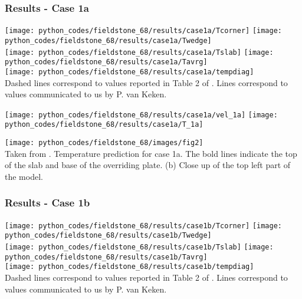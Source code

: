 \newpage
\subsubsection*{Results - Case 1a} 

\begin{center}
\texttt{[image: python\_codes/fieldstone\_68/results/case1a/Tcorner]}
\texttt{[image: python\_codes/fieldstone\_68/results/case1a/Twedge]}\\
\texttt{[image: python\_codes/fieldstone\_68/results/case1a/Tslab]}
\texttt{[image: python\_codes/fieldstone\_68/results/case1a/Tavrg]}\\
\texttt{[image: python\_codes/fieldstone\_68/results/case1a/tempdiag]}\\
{\captionfont Dashed lines correspond to values reported in Table 2 of \cite{vack08}.
Lines correspond to values communicated to us by P. van Keken.}
\end{center}

\begin{center}
\texttt{[image: python\_codes/fieldstone\_68/results/case1a/vel\_1a]}
\texttt{[image: python\_codes/fieldstone\_68/results/case1a/T\_1a]}
\end{center}

\begin{center}
\texttt{[image: python\_codes/fieldstone\_68/images/fig2]}\\
{\captionfont Taken from \cite{vack08}. Temperature prediction for case 1a. 
The bold lines indicate the top of the slab and base of the overriding plate. 
(b) Close up of the top left part of the model.}
\end{center}


\newpage
\subsubsection*{Results - Case 1b}

\begin{center}
\texttt{[image: python\_codes/fieldstone\_68/results/case1b/Tcorner]}
\texttt{[image: python\_codes/fieldstone\_68/results/case1b/Twedge]}\\
\texttt{[image: python\_codes/fieldstone\_68/results/case1b/Tslab]}
\texttt{[image: python\_codes/fieldstone\_68/results/case1b/Tavrg]}\\
\texttt{[image: python\_codes/fieldstone\_68/results/case1b/tempdiag]}\\
{\captionfont Dashed lines correspond to values reported in Table 2 of \cite{vack08}.
Lines correspond to values communicated to us by P. van Keken.}
\end{center}

